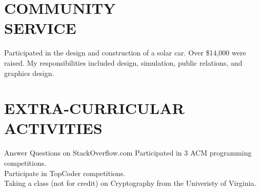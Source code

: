 \documentclass[line,margin]{res}
\begin{document}
\begin{resume}
\section{COMMUNITY \\ SERVICE} Participated in the design and construction of a solar car. Over \$14,000 were raised. My responsibilities included design, simulation, public relations, and graphics design.

\section{EXTRA-CURRICULAR \\ ACTIVITIES}
	Answer Questions on StackOverflow.com
	Participated in 3 ACM programming competitions.\\
	Participate in TopCoder competitions.\\
	Taking a class (not for credit) on Cryptography from the Univeristy of Virginia.
\end{resume}
\end{document}
